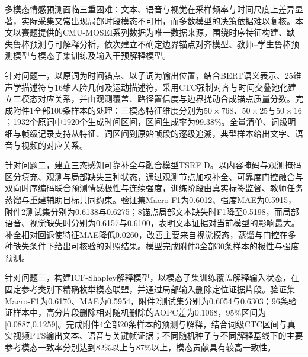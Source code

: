 多模态情感预测面临三重困难：文本、语音与视觉在采样频率与时间尺度上差异显著，实际采集又常出现局部时段模态不可用，而多数模型的决策依据难以复核。本文以赛题提供的CMU-MOSEI系列数据为唯一数据来源，围绕时序特征构建、缺失鲁棒预测与可解释分析，依次建立不确定边界锚点对齐模型、教师--学生鲁棒预测模型与模态子集训练及输入干预解释模型。

针对问题一，以原词为时间锚点、以子词为输出位置，结合BERT语义表示、25维声学描述符与16维人脸几何及运动描述符，采用CTC强制对齐与时间交叠池化建立三模态对应关系，并由观测覆盖、路径置信度与边界扰动合成锚点质量分数。完成附件1全部100条样本的处理：三模态特征维度分别为$50\times768$、$50\times25$与$50\times16$；1932个原词中1920个生成时间区间，区间生成率为99.38\%。全量清单、词级明细与帧级记录支持从特征、词区间到原始帧段的逐级追溯，典型样本给出文字、语音与视频的对应关系。

针对问题二，建立三态感知可靠补全与融合模型TSRF-D。以内容掩码与观测掩码区分填充、观测与局部缺失三种状态，通过观测节点加权补全、可靠度门控融合与双向时序编码联合预测情感极性与连续强度，训练阶段由真实标签监督、教师任务蒸馏与重建辅助目标共同约束。验证集Macro-F1为0.6012、强度MAE为0.5915，附件2测试集分别为0.6138与0.6275；8锚点局部文本缺失时F1降至0.5198，而局部语音、视觉缺失时分别为0.6157与0.6100，表明文本证据对当前模型的影响最大。补全相对回退使特征MAE降低0.0260，改善主要来自视觉模态，蒸馏与门控在多种缺失条件下给出可核验的对照结果。模型完成附件3全部30条样本的极性与强度预测。

针对问题三，构建ICF-Shapley解释模型，以模态子集训练覆盖解释输入状态，在固定参考类别下精确枚举模态联盟，并通过局部输入删除定位证据片段。验证集Macro-F1为0.6170、MAE为0.5954，附件2测试集分别为0.6054与0.6303；96条验证样本中，高分片段删除相对随机删除的AOPC差为0.1068，95\%区间为[0.0887,0.1259]。完成附件4全部20条样本的预测与解释，结合词级CTC区间与真实视频PTS输出文本、语音与关键帧证据；不同随机种子与不同解释基线下的主要参考模态一致率分别达到82\%以上与87\%以上，模态贡献具有较高一致性。

